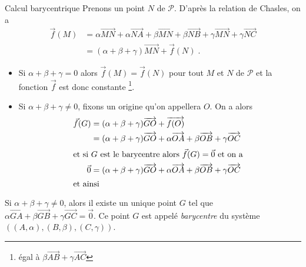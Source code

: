 \begin{chapter}{Calcul barycentrique}
Prenons un point $N$ de $\mathcal{P}$.
D'apr\`es la relation de Chasles, on a \\
\begin{align*}
\vec{f}(M) & = \alpha \overrightarrow{MN} + \alpha \overrightarrow{NA} + \beta \overrightarrow{MN} + \beta \overrightarrow{NB} + \gamma \overrightarrow{MN} + \gamma \overrightarrow{NC} \\
           & = (\alpha + \beta + \gamma) \overrightarrow{MN} + \vec{f}(N)      \; .
\end{align*}
\begin{itemize} 
\item Si $\alpha + \beta + \gamma = 0$ alors $\vec{f}(M) = \vec{f}(N)$ pour tout $M$ et $N$ de $\mathcal{P}$ et la fonction $\vec{f}$ est donc constante%
\footnote{\'egal \`a $\beta \overrightarrow{AB} + \gamma \overrightarrow{AC}$}.
\item Si $\alpha + \beta + \gamma \neq 0$, fixons un origine qu'on appellera $O$.
      On a alors
      \begin{align*}
      \vec{f}(G) & = (\alpha + \beta + \gamma) \overrightarrow{GO} + \overrightarrow{f(O)} \\
                 & = (\alpha + \beta + \gamma) \overrightarrow{GO} + \alpha \overrightarrow{OA} + \beta \overrightarrow{OB} + \gamma \overrightarrow{OC} \\
      \intertext{et si $G$ est le barycentre alors $\vec{f}(G) = \vec{0}$ et on a }
      \vec{0} & = (\alpha + \beta + \gamma) \overrightarrow{GO} + \alpha \overrightarrow{OA} + \beta \overrightarrow{OB} + \gamma \overrightarrow{OC} \\
      \intertext{et ainsi}
      \end{align*}
\end{itemize}
%
\begin{thm}
Si $\alpha + \beta + \gamma \neq 0$, alors il existe un unique point $G$ tel que $\alpha \overrightarrow{GA} + \beta \overrightarrow{GB} + \gamma \overrightarrow{GC} = \vec{0}$.
Ce point $G$ est appel\'e \emph{barycentre} du syst\`eme $((A,\alpha),(B,\beta),(C,\gamma))$.
\end{thm}
%

\end{chapter}

